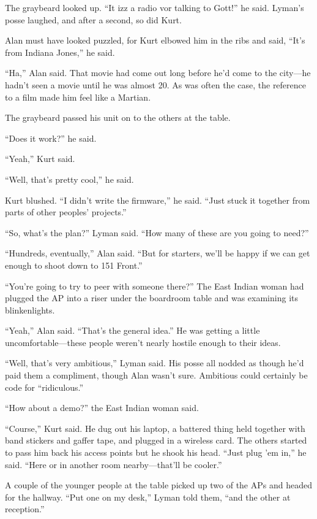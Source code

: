 \documentclass{article}
\begin{document}
The graybeard looked up.  ``It izz a radio vor talking to Gott!'' he
said.  Lyman's posse laughed, and after a second, so did Kurt.

Alan must have looked puzzled, for Kurt elbowed him in the ribs and
said, ``It's from Indiana Jones,'' he said.

``Ha,'' Alan said.  That movie had come out long before he'd come to
the city---he hadn't seen a movie until he was almost 20.  As was
often the case, the reference to a film made him feel like a Martian.

The graybeard passed his unit on to the others at the table.

``Does it work?'' he said.

``Yeah,'' Kurt said.

``Well, that's pretty cool,'' he said.

Kurt blushed.  ``I didn't write the firmware,'' he said.  ``Just stuck
it together from parts of other peoples' projects.''

``So, what's the plan?'' Lyman said.  ``How many of these are you
going to need?''

``Hundreds, eventually,'' Alan said.  ``But for starters, we'll be
happy if we can get enough to shoot down to 151 Front.''

``You're going to try to peer with someone there?'' The East Indian
woman had plugged the AP into a riser under the boardroom table and
was examining its blinkenlights.

``Yeah,'' Alan said.  ``That's the general idea.'' He was getting a
little uncomfortable---these people weren't nearly hostile enough to
their ideas.

``Well, that's very ambitious,'' Lyman said.  His posse all nodded as
though he'd paid them a compliment, though Alan wasn't sure. 
Ambitious could certainly be code for ``ridiculous.''

``How about a demo?'' the East Indian woman said.

``Course,'' Kurt said.  He dug out his laptop, a battered thing held
together with band stickers and gaffer tape, and plugged in a wireless
card.  The others started to pass him back his access points but he
shook his head.  ``Just plug 'em in,'' he said.  ``Here or in another
room nearby---that'll be cooler.''

A couple of the younger people at the table picked up two of the APs
and headed for the hallway.  ``Put one on my desk,'' Lyman told them,
``and the other at reception.''
\end{document}
